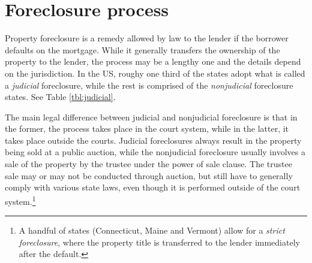\documentclass[11pt,twopage]{article}
\begin{document}
\section{Foreclosure process}
Property foreclosure is a remedy allowed by law to the lender if the borrower defaults on the mortgage. While it generally transfers the ownership of the property to the lender, the process may be a lengthy one and the details depend on the jurisdiction. In the US, roughy one third of the states adopt what is called a \emph{judicial} foreclosure, while the rest is comprised of the \emph{nonjudicial} foreclosure states. See Table \ref{tbl:judicial}.

The main legal difference between judicial and nonjudicial foreclosure is that in the former, the process takes place in the court system, while in the latter, it takes place outside the courts. Judicial foreclosures always result in the property being sold at a public auction, while the nonjudicial foreclosure usually involves a sale of the property by the trustee under the power of sale clause. The trustee sale may or may not be conducted through auction, but still have to generally comply with various state laws, even though it is performed outside of the court system.\footnote{A handful of states (Connecticut, Maine and Vermont) allow for a \emph{strict foreclosure}, where the property title is transferred to the lender immediately after the default.} 
\end{document}
